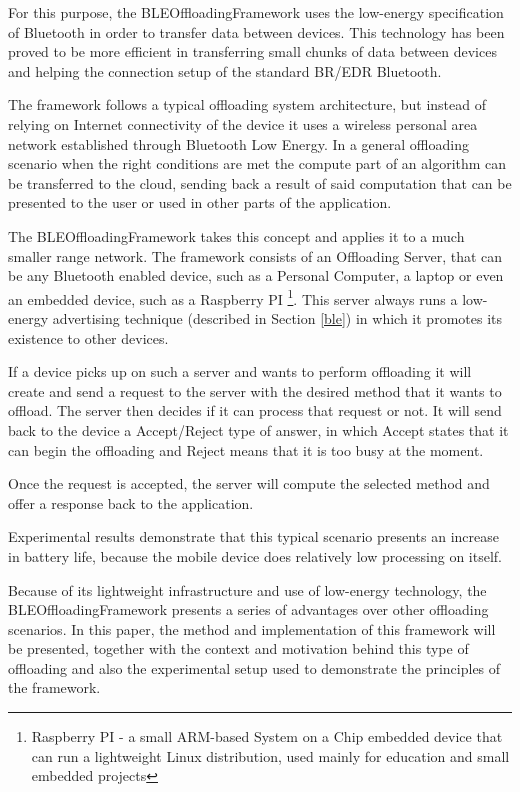 For this purpose, the BLEOffloadingFramework uses the low-energy specification of Bluetooth in order to transfer data between devices. This technology has been proved to be more efficient in transferring small chunks of data between devices \cite{mackensen2012performance} and helping the connection setup of the standard BR/EDR Bluetooth.

The framework follows a typical offloading system architecture, but instead of relying on Internet connectivity of the device it uses a wireless personal area network established through Bluetooth Low Energy. In a general offloading scenario when the right conditions are met the compute part of an algorithm can be transferred to the cloud, sending back a result of said computation that can be presented to the user or used in other parts of the application.





The BLEOffloadingFramework takes this concept and applies it to a much smaller range network. The framework consists of an Offloading Server, that can be any Bluetooth enabled device, such as a Personal Computer, a laptop or even an embedded device, such as a Raspberry PI \footnote{Raspberry PI - a small ARM-based System on a Chip embedded device that can run a lightweight Linux distribution, used mainly for education and small embedded projects}. This server always runs a low-energy advertising technique (described in Section \ref{ble}) in which it promotes its existence to other devices.

If a device picks up on such a server and wants to perform offloading it will create and send a request to the server with the desired method that it wants to offload. The server then decides if it can process that request or not. It will send back to the device a Accept/Reject type of answer, in which Accept states that it can begin the offloading and Reject means that it is too busy at the moment.

Once the request is accepted, the server will compute the selected method and offer a response back to the application. 

Experimental results demonstrate that this typical scenario presents an increase in battery life, because the mobile device does relatively low processing on itself.

Because of its lightweight infrastructure and use of low-energy technology, the BLEOffloadingFramework presents a series of advantages over other offloading scenarios. In this paper, the method and implementation of this framework will be presented, together with the context and motivation behind this type of offloading and also the experimental setup used to demonstrate the principles of the framework.


